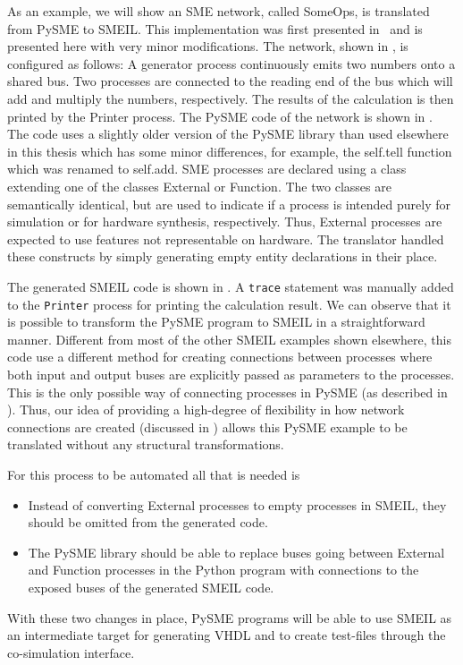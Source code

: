 As an example, we will show an SME network, called SomeOps, is translated from
PySME to SMEIL. This implementation was first presented in~\cite{asheim2016vhdl}
and is presented here with very minor modifications. The network, shown in
, is configured as follows: A generator process continuously
emits two numbers onto a shared bus. Two processes are connected to the reading
end of the bus which will add and multiply the numbers, respectively. The
results of the calculation is then printed by the Printer process.  The PySME
code of the network is shown in . The code uses a slightly
older version of the PySME library than used elsewhere in this thesis which has
some minor differences, for example, the {\ttfamily self.tell} function which
was renamed to {\ttfamily self.add}.  SME processes are declared using a class
extending one of the classes {\ttfamily External} or {\ttfamily Function}.  The
two classes are semantically identical, but are used to indicate if a process is
intended purely for simulation or for hardware synthesis, respectively.  Thus,
{\ttfamily External} processes are expected to use features not representable on
hardware.  The translator handled these constructs by simply generating empty
entity declarations in their place.

The generated SMEIL code is shown in . A {\tt trace}
statement was manually added to the {\tt Printer} process for printing the
calculation result. We can observe that it is possible to transform the PySME
program to SMEIL in a straightforward manner. Different from most of the other
SMEIL examples shown elsewhere, this code use a different method for creating
connections between processes where both input and output buses are explicitly
passed as parameters to the processes. This is the only possible way of
connecting processes in PySME (as described in ). Thus, our idea
of providing a high-degree of flexibility in how network connections are created
(discussed in ) allows this PySME example to be translated
without any structural transformations.

For this process to be automated all that is needed is
\begin{itemize}
  \item Instead of converting {\ttfamily External} processes to empty processes
    in SMEIL, they should be omitted from the generated code.
  \item The PySME library should be able to replace buses going between
    {\ttfamily External} and {\ttfamily Function} processes in the Python
    program with connections to the {\ttfamily exposed} buses of the generated
    SMEIL code.
\end{itemize}
With these two changes in place, PySME programs will be able to use SMEIL as an
intermediate target for generating VHDL and to create test-files through the
co-simulation interface.

